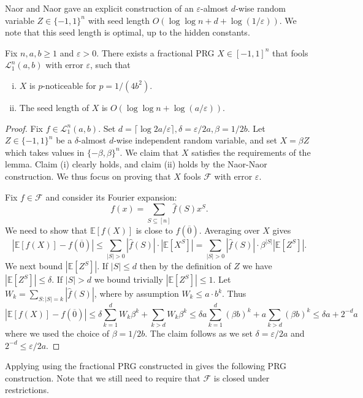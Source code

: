 \documentclass{toc}
\newcommand{\E}{\mathbb{E}}
\newcommand{\FF}{\mathcal{F}}
\newcommand{\LL}{\mathcal{L}}
\newcommand{\eps}{\varepsilon}
\newcommand{\zero}{\overline{0}}
\begin{document}
Naor and Naor \cite{naor1993small} gave an explicit construction of an $\eps$-almost $d$-wise random variable
$Z \in \{-1,1\}^n$ with seed length $O(\log\log n +  d + \log(1/\eps))$. We note that this seed length is optimal, up to the hidden constants.

\begin{lemma}\label{lemma:L1}
Fix $n,a,b \ge 1$ and $\eps>0$. There exists a fractional PRG $X \in [-1,1]^n$ that fools $\LL_1^n(a,b)$
with error $\eps$, such that
\begin{enumerate}[(i)]
\item $X$ is $p$-noticeable for $p={1}/{(4 b^2)}$.
\item The seed length of $X$ is $O(\log \log n + \log(a/\eps))$.
\end{enumerate}
\end{lemma}

\begin{proof}
Fix $f \in \LL_1^n(a,b)$.
Set $d=\lceil \log 2a/ \eps \rceil, \delta=\eps/2a, \beta=1/2b$. Let $Z \in \{-1,1\}^n$ be a $\delta$-almost $d$-wise independent random variable,
and set $X=\beta Z$ which takes values in $\{-\beta,\beta\}^n$. We claim that $X$ satisfies the requirements of the lemma. Claim (i) clearly holds, and claim (ii) holds by the Naor-Naor construction. We thus focus on proving that $X$ fools $\FF$ with error $\eps$.

Fix $f \in \FF$ and consider its Fourier expansion:
$$
f(x) = \sum_{S \subseteq [n]} \widehat{f}(S)  x^S.
$$
We need to show that $\E[f(X)]$ is close to $f(\zero)$. Averaging over $X$ gives
$$
|\E[f(X)]-f(\zero)| \le \sum_{|S|>0} |\widehat{f}(S)| \cdot |\E[X^S]| =
\sum_{|S|>0} |\widehat{f}(S)| \cdot \beta^{|S|} |\E[Z^S]|.
$$
We next bound $|\E[Z^S]|$. If $|S| \le d$ then by the definition of $Z$
we have $|\E[Z^S]| \le \delta$. If $|S|>d$ we bound trivially $|\E[Z^S]| \le 1$. Let $W_k = \sum_{S: |S|=k } |\hat{f}(S)|$, where by assumption $W_k \le a \cdot b^k$. Thus
$$
|\E[f(X)]-f(\zero)| \le \delta \sum_{k=1}^d W_k \beta^k + \sum_{k>d} W_k \beta^k \le  \delta a \sum_{k=1}^d (\beta b)^k + a \sum_{k>d} (\beta b)^k \le \delta a + 2^{-d} a
$$
where we used the choice of $\beta = 1/2b$. The claim follows as we set $\delta=\eps/2a $ and $2^{-d} \le \eps/2a$.
\end{proof}

Applying  using the fractional PRG constructed in  gives the following PRG construction. Note that
we still need to require that $\FF$ is closed under restrictions.
\end{document}
